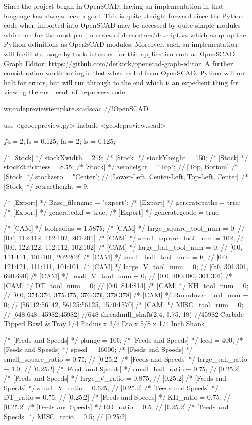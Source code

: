 \documentclass{ltxdoc}
\begin{document}
Since the project began in OpenSCAD, having an implementation in that language has always been a goal. This is quite straight-forward since the Python code when imported into OpenSCAD may be accessed by quite simple modules which are for the most part, a series of decorators/descriptors which wrap up the Python definitions as OpenSCAD modules. Moreover, such an implementation will facilitate usage by tools intended for this application such as OpenSCAD Graph Editor: \url{https://github.com/derkork/openscad-graph-editor}. A further consideration worth noting is that when called from OpenSCAD, Python will not halt for errors, but will run through to the end which is an expedient thing for viewing the end result of in-process code.

\lstset{firstnumber=1}%
\begin{writecode}{w}{gcodepreviewtemplate.scad}{scad}
//!OpenSCAD

use <gcodepreview.py>
include <gcodepreview.scad>

$fa = 2;
$fs = 0.125;
fa = 2;
fs = 0.125;

/* [Stock] */
stockXwidth = 219;
/* [Stock] */
stockYheight = 150;
/* [Stock] */
stockZthickness = 8.35;
/* [Stock] */
zeroheight = "Top"; // [Top, Bottom]
/* [Stock] */
stockzero = "Center"; // [Lower-Left, Center-Left, Top-Left, Center]
/* [Stock] */
retractheight = 9;

/* [Export] */
Base_filename = "export"; 
/* [Export] */
generatepaths = true; 
/* [Export] */
generatedxf = true; 
/* [Export] */
generategcode = true; 

/* [CAM] */
toolradius = 1.5875;
/* [CAM] */
large_square_tool_num = 0; // [0:0, 112:112, 102:102, 201:201]
/* [CAM] */
small_square_tool_num = 102; // [0:0, 122:122, 112:112, 102:102]
/* [CAM] */
large_ball_tool_num = 0; // [0:0, 111:111, 101:101, 202:202]
/* [CAM] */
small_ball_tool_num = 0; // [0:0, 121:121, 111:111, 101:101]
/* [CAM] */
large_V_tool_num = 0; // [0:0, 301:301, 690:690]
/* [CAM] */
small_V_tool_num = 0; // [0:0, 390:390, 301:301]
/* [CAM] */
DT_tool_num = 0; // [0:0, 814:814]
/* [CAM] */
KH_tool_num = 0; // [0:0, 374:374, 375:375, 376:376, 378:378]
/* [CAM] */
Roundover_tool_num = 0; // [56142:56142, 56125:56125, 1570:1570]
/* [CAM] */
MISC_tool_num = 0; // [648:648, 45982:45982]
//648 threadmill_shaft(2.4, 0.75, 18)
//45982 Carbide Tipped Bowl & Tray 1/4 Radius x 3/4 Dia x 5/8 x 1/4 Inch Shank

/* [Feeds and Speeds] */
plunge = 100;
/* [Feeds and Speeds] */
feed = 400;
/* [Feeds and Speeds] */
speed = 16000;
/* [Feeds and Speeds] */
small_square_ratio = 0.75; // [0.25:2]
/* [Feeds and Speeds] */
large_ball_ratio = 1.0; // [0.25:2]
/* [Feeds and Speeds] */
small_ball_ratio = 0.75; // [0.25:2]
/* [Feeds and Speeds] */
large_V_ratio = 0.875; // [0.25:2]
/* [Feeds and Speeds] */
small_V_ratio = 0.625; // [0.25:2]
/* [Feeds and Speeds] */
DT_ratio = 0.75; // [0.25:2]
/* [Feeds and Speeds] */
KH_ratio = 0.75; // [0.25:2]
/* [Feeds and Speeds] */
RO_ratio = 0.5; // [0.25:2]
/* [Feeds and Speeds] */
MISC_ratio = 0.5; // [0.25:2]


\end{writecode}
\end{document}
